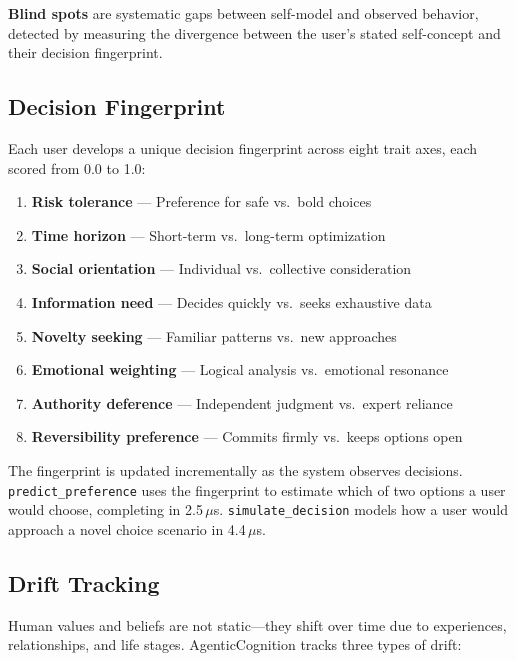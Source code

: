 \documentclass[10pt, twocolumn]{article}
\begin{document}
\textbf{Blind spots} are systematic gaps between self-model and observed behavior, detected by measuring the divergence between the user's stated self-concept and their decision fingerprint.

\subsection{Decision Fingerprint}
\label{sec:fingerprint}

Each user develops a unique decision fingerprint across eight trait axes, each scored from 0.0 to 1.0:

\begin{enumerate}[nosep, leftmargin=*]
  \item \textbf{Risk tolerance} --- Preference for safe vs.\ bold choices
  \item \textbf{Time horizon} --- Short-term vs.\ long-term optimization
  \item \textbf{Social orientation} --- Individual vs.\ collective consideration
  \item \textbf{Information need} --- Decides quickly vs.\ seeks exhaustive data
  \item \textbf{Novelty seeking} --- Familiar patterns vs.\ new approaches
  \item \textbf{Emotional weighting} --- Logical analysis vs.\ emotional resonance
  \item \textbf{Authority deference} --- Independent judgment vs.\ expert reliance
  \item \textbf{Reversibility preference} --- Commits firmly vs.\ keeps options open
\end{enumerate}

The fingerprint is updated incrementally as the system observes decisions. \texttt{predict\_preference} uses the fingerprint to estimate which of two options a user would choose, completing in 2.5\,$\mu$s. \texttt{simulate\_decision} models how a user would approach a novel choice scenario in 4.4\,$\mu$s.

\subsection{Drift Tracking}
\label{sec:drift}

Human values and beliefs are not static---they shift over time due to experiences, relationships, and life stages. AgenticCognition tracks three types of drift:
\end{document}
